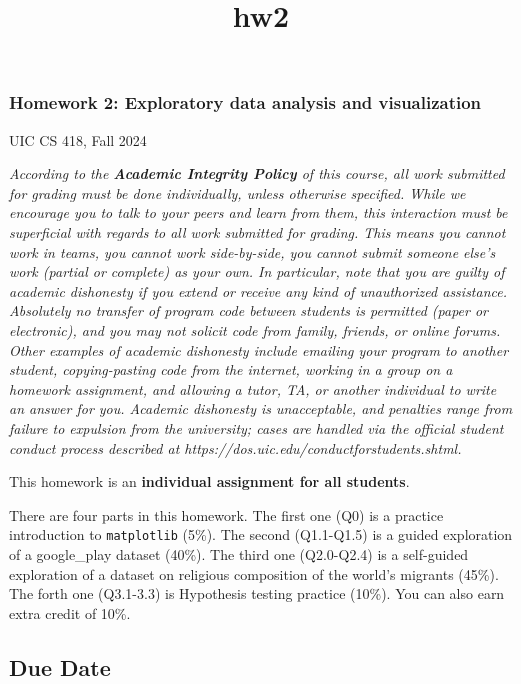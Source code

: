 \documentclass[11pt]{article}
\title{hw2}
\begin{document}
    
    \maketitle
    
    

    
    \subsubsection{Homework 2: Exploratory data analysis and
visualization}\label{homework-2-exploratory-data-analysis-and-visualization}

UIC CS 418, Fall 2024

\emph{According to the \textbf{Academic Integrity Policy} of this
course, all work submitted for grading must be done individually, unless
otherwise specified. While we encourage you to talk to your peers and
learn from them, this interaction must be superficial with regards to
all work submitted for grading. This means you cannot work in teams, you
cannot work side-by-side, you cannot submit someone else's work (partial
or complete) as your own. In particular, note that you are guilty of
academic dishonesty if you extend or receive any kind of unauthorized
assistance. Absolutely no transfer of program code between students is
permitted (paper or electronic), and you may not solicit code from
family, friends, or online forums. Other examples of academic dishonesty
include emailing your program to another student, copying-pasting code
from the internet, working in a group on a homework assignment, and
allowing a tutor, TA, or another individual to write an answer for you.
Academic dishonesty is unacceptable, and penalties range from failure to
expulsion from the university; cases are handled via the official
student conduct process described at
https://dos.uic.edu/conductforstudents.shtml.}

This homework is an \textbf{individual assignment for all students}.

There are four parts in this homework. The first one (Q0) is a practice
introduction to \texttt{matplotlib} (5\%). The second (Q1.1-Q1.5) is a
guided exploration of a google\_play dataset (40\%). The third one
(Q2.0-Q2.4) is a self-guided exploration of a dataset on religious
composition of the world's migrants (45\%). The forth one (Q3.1-3.3) is
Hypothesis testing practice (10\%). You can also earn extra credit of
10\%.

\subsection{Due Date}\label{due-date}
\end{document}
